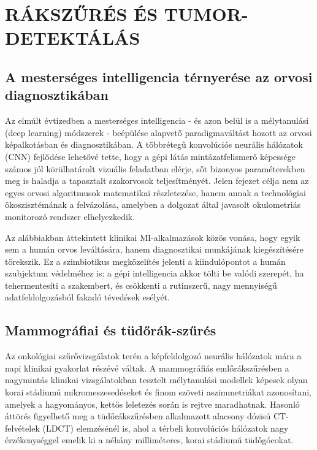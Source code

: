 \documentclass[12pt,a4paper,oneside]{book}
\begin{document}
\section{RÁKSZŰRÉS ÉS TUMOR-DETEKTÁLÁS}

\subsection{A mesterséges intelligencia térnyerése az orvosi diagnosztikában}

Az elmúlt évtizedben a mesterséges intelligencia - és azon belül is a mélytanulási (deep learning) módszerek - beépülése alapvető paradigmaváltást hozott az orvosi képalkotásban és diagnosztikában. A többrétegű konvolúciós neurális hálózatok (CNN) fejlődése lehetővé tette, hogy a gépi látás mintázatfelismerő képessége számos jól körülhatárolt vizuális feladatban elérje, sőt bizonyos paraméterekben meg is haladja a tapasztalt szakorvosok teljesítményét. Jelen fejezet célja nem az egyes orvosi algoritmusok matematikai részletezése, hanem annak a technológiai ökoszisztémának a felvázolása, amelyben a dolgozat által javasolt okulometriás monitorozó rendszer elhelyezkedik.

Az alábbiakban áttekintett klinikai MI-alkalmazások közös vonása, hogy egyik sem a humán orvos leváltására, hanem diagnosztikai munkájának kiegészítésére törekszik. Ez a szimbiotikus megközelítés jelenti a kiindulópontot a humán szubjektum védelméhez is: a gépi intelligencia akkor tölti be valódi szerepét, ha tehermentesíti a szakembert, és csökkenti a rutinszerű, nagy mennyiségű adatfeldolgozásból fakadó tévedések esélyét.

\subsection{Mammográfiai és tüdőrák-szűrés}

Az onkológiai szűrővizsgálatok terén a képfeldolgozó neurális hálózatok mára a napi klinikai gyakorlat részévé váltak. A mammográfiás emlőrákszűrésben a nagymintás klinikai vizsgálatokban tesztelt mélytanulási modellek képesek olyan korai stádiumú mikromeszesedéseket és finom szöveti aszimmetriákat azonosítani, amelyek a hagyományos, kettős leletezés során is rejtve maradhatnak. Hasonló áttörés figyelhető meg a tüdőrákszűrésben alkalmazott alacsony dózisú CT-felvételek (LDCT) elemzésénél is, ahol a térbeli konvolúciós hálózatok nagy érzékenységgel emelik ki a néhány milliméteres, korai stádiumú tüdőgócokat.
\end{document}
